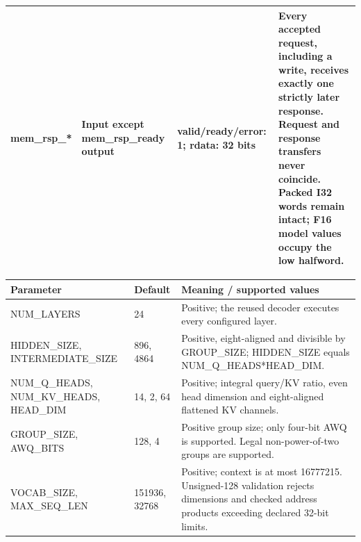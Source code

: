 \documentclass[11pt,a4paper]{article}
\begin{document}
{\begin{longtable}{@{}L{0.21\textwidth}|L{0.12\textwidth}|L{0.12\textwidth}|L{0.45\textwidth}@{}}
mem\_\allowbreak{}rsp\_\allowbreak{}*\allowbreak{} & Input except mem\_\allowbreak{}rsp\_\allowbreak{}ready output & valid/\allowbreak{}ready/\allowbreak{}error: 1; rdata: 32 bits & Every accepted request,\allowbreak{} including a write,\allowbreak{} receives exactly one strictly later response. Request and response transfers never coincide. Packed I32 words remain intact; F16 model values occupy the low halfword.\\[2pt]\hline

\bottomrule\end{longtable}}

{\small\renewcommand{\arraystretch}{1.18}\begin{longtable}{@{}L{0.22\textwidth}|L{0.21\textwidth}|L{0.49\textwidth}@{}}\toprule

\textbf{Parameter} & \textbf{Default} & \textbf{Meaning /\allowbreak{} supported values}\\\midrule\endhead

NUM\_\allowbreak{}LAYERS & 24 & Positive; the reused decoder executes every configured layer.\\[2pt]\hline

HIDDEN\_\allowbreak{}SIZE,\allowbreak{} INTERMEDIATE\_\allowbreak{}SIZE & 896,\allowbreak{} 4864 & Positive,\allowbreak{} eight-aligned and divisible by GROUP\_\allowbreak{}SIZE; HIDDEN\_\allowbreak{}SIZE equals NUM\_\allowbreak{}Q\_\allowbreak{}HEADS*\allowbreak{}HEAD\_\allowbreak{}DIM.\\[2pt]\hline

NUM\_\allowbreak{}Q\_\allowbreak{}HEADS,\allowbreak{} NUM\_\allowbreak{}KV\_\allowbreak{}HEADS,\allowbreak{} HEAD\_\allowbreak{}DIM & 14,\allowbreak{} 2,\allowbreak{} 64 & Positive; integral query/\allowbreak{}KV ratio,\allowbreak{} even head dimension and eight-aligned flattened KV channels.\\[2pt]\hline

GROUP\_\allowbreak{}SIZE,\allowbreak{} AWQ\_\allowbreak{}BITS & 128,\allowbreak{} 4 & Positive group size; only four-bit AWQ is supported. Legal non-power-of-two groups are supported.\\[2pt]\hline

VOCAB\_\allowbreak{}SIZE,\allowbreak{} MAX\_\allowbreak{}SEQ\_\allowbreak{}LEN & 151936,\allowbreak{} 32768 & Positive; context is at most 16777215. Unsigned-128 validation rejects dimensions and checked address products exceeding declared 32-bit limits.\\[2pt]\hline

\bottomrule\end{longtable}}
\end{document}
